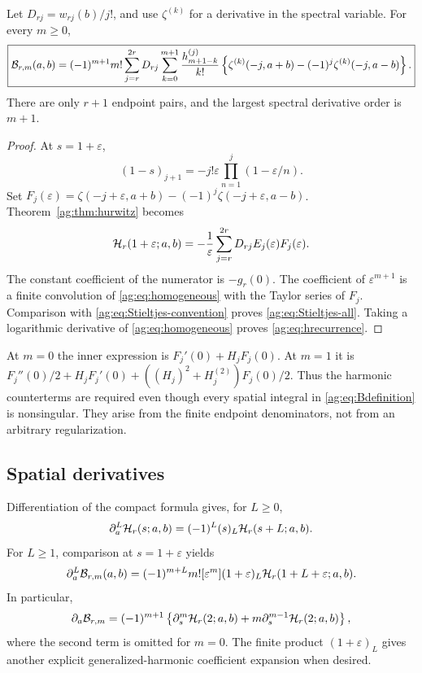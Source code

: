 \begin{theorem}
\label{ag:thm:Stieltjes}
Let $D_{rj}=w_{rj}(b)/j!$, and use $\zeta^{(k)}$ for a derivative
in the spectral variable. For every $m\ge0$,
\begin{align}
 \boxed{\displaystyle
 \mathcal B_{r,m}(a,b)=(-1)^{m+1}m!
 \sum_{j=r}^{2r}D_{rj}\sum_{k=0}^{m+1}
 \frac{h_{m+1-k}^{(j)}}{k!}
 \left\{\zeta^{(k)}(-j,a+b)-(-1)^j\zeta^{(k)}(-j,a-b)\right\}.}
 \label{ag:eq:Stieltjes-all}
\end{align}
There are only $r+1$ endpoint pairs, and the largest spectral derivative
order is $m+1$.
\end{theorem}
\begin{proof}
At $s=1+\varepsilon$,
\[
 (1-s)_{j+1}=-j!\varepsilon\prod_{n=1}^j(1-\varepsilon/n).
\]
Set
$F_j(\varepsilon)=\zeta(-j+\varepsilon,a+b)
 -(-1)^j\zeta(-j+\varepsilon,a-b)$.
Theorem~\ref{ag:thm:hurwitz} becomes
\begin{equation}\label{ag:eq:H-Laurent-master}
 \mathcal H_r(1+\varepsilon;a,b)
 =-\frac1\varepsilon\sum_{j=r}^{2r}D_{rj}
                          E_j(\varepsilon)F_j(\varepsilon).
\end{equation}
The constant coefficient of the numerator is $-g_r(0)$.
The coefficient of $\varepsilon^{m+1}$ is a finite convolution of
\eqref{ag:eq:homogeneous} with the Taylor series of $F_j$.
Comparison with \eqref{ag:eq:Stieltjes-convention} proves
\eqref{ag:eq:Stieltjes-all}. Taking a logarithmic derivative of
\eqref{ag:eq:homogeneous} proves \eqref{ag:eq:hrecurrence}.
\end{proof}

At $m=0$ the inner expression is $F_j'(0)+H_jF_j(0)$.
At $m=1$ it is
$F_j''(0)/2+H_jF_j'(0)+((H_j)^2+H_j^{(2)})F_j(0)/2$.
Thus the harmonic counterterms are required even though every spatial
integral in \eqref{ag:eq:Bdefinition} is nonsingular. They arise from
the finite endpoint denominators, not from an arbitrary regularization.

\subsection{Spatial derivatives}
Differentiation of the compact formula gives, for $L\ge0$,
\begin{equation}\label{ag:eq:H-spatial}
 \partial_a^L\mathcal H_r(s;a,b)=(-1)^L(s)_L\mathcal H_r(s+L;a,b).
\end{equation}
For $L\ge1$, comparison at $s=1+\varepsilon$ yields
\begin{equation}\label{ag:eq:B-spatial}
 \partial_a^L\mathcal B_{r,m}(a,b)
 =(-1)^{m+L}m![\varepsilon^m]
       (1+\varepsilon)_L\mathcal H_r(1+L+\varepsilon;a,b).
\end{equation}
In particular,
\[
 \partial_a\mathcal B_{r,m}=(-1)^{m+1}
  \left\{\partial_s^m\mathcal H_r(2;a,b)
                   +m\partial_s^{m-1}\mathcal H_r(2;a,b)\right\},
\]
where the second term is omitted for $m=0$. The finite product
$(1+\varepsilon)_L$ gives another explicit generalized-harmonic
coefficient expansion when desired.

